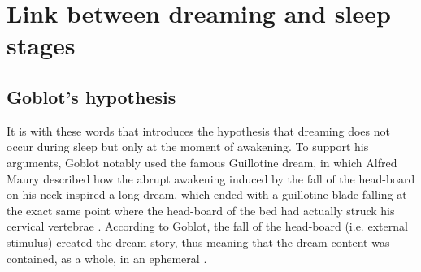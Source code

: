 %

\section{Link between dreaming and sleep stages}
\label{sec:dream-research:link}

\subsection{Goblot's hypothesis}
\label{sec:dream-research:link:goblot}


It is with these words that \citet{goblot_souvenir_1896} introduces the hypothesis that dreaming does not occur during sleep but only at the moment of awakening. To support his arguments, Goblot notably used the famous Guillotine dream, in which Alfred Maury described how the abrupt awakening induced by the fall of the head-board on his neck inspired a long dream, which ended with a guillotine blade falling at the exact same point where the head-board of the bed had actually struck his cervical vertebrae \citep{maury_sommeil_1865}. According to Goblot, the fall of the head-board (i.e. external stimulus) created the dream story, thus meaning that the dream content was contained, as a whole, in an ephemeral .

